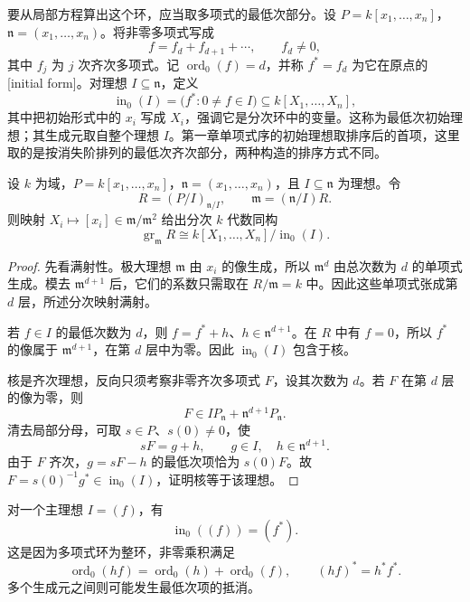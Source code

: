 \ProseParagraphBreak

要从局部方程算出这个环，应当取多项式的最低次部分。设 \(P=k[x_1,\ldots,x_n]\)，\(\mathfrak n=(x_1,\ldots,x_n)\)。将非零多项式写成
\[
	f=f_d+f_{d+1}+\cdots,\qquad f_d\ne0,
\]
其中 \(f_j\) 为 \(j\) 次齐次多项式。记 \(\operatorname{ord}_0(f)=d\)，并称 \(f^\ast=f_d\) 为它在原点的[initial form]。对理想 \(I\subseteq\mathfrak n\)，定义
\[
	\operatorname{in}_0(I)
	=\bigl(f^\ast:0\ne f\in I\bigr)\subseteq k[X_1,\ldots,X_n],
\]
其中把初始形式中的 \(x_i\) 写成 \(X_i\)，强调它是分次环中的变量。这称为最低次初始理想；其生成元取自整个理想 \(I\)。第一章单项式序的初始理想取排序后的首项，这里取的是按消失阶排列的最低次齐次部分，两种构造的排序方式不同。

\begin{proposition}
\label{g5:prop:initial-ideal-tangent-cone}
	设 \(k\) 为域，\(P=k[x_1,\ldots,x_n]\)，\(\mathfrak n=(x_1,\ldots,x_n)\)，且 \(I\subseteq\mathfrak n\) 为理想。令
	\[
		R=(P/I)_{\mathfrak n/I},\qquad
		\mathfrak m=(\mathfrak n/I)R.
	\]
	则映射 \(X_i\mapsto[x_i]\in\mathfrak m/\mathfrak m^2\) 给出分次 \(k\) 代数同构
	\[
		\operatorname{gr}_{\mathfrak m}R
		\cong k[X_1,\ldots,X_n]/\operatorname{in}_0(I).
	\]
\end{proposition}
\begin{proof}
	先看满射性。极大理想 \(\mathfrak m\) 由 \(x_i\) 的像生成，所以 \(\mathfrak m^d\) 由总次数为 \(d\) 的单项式生成。模去 \(\mathfrak m^{d+1}\) 后，它们的系数只需取在 \(R/\mathfrak m=k\) 中。因此这些单项式张成第 \(d\) 层，所述分次映射满射。

	若 \(f\in I\) 的最低次数为 \(d\)，则 \(f=f^\ast+h\)、\(h\in\mathfrak n^{d+1}\)。在 \(R\) 中有 \(f=0\)，所以 \(f^\ast\) 的像属于 \(\mathfrak m^{d+1}\)，在第 \(d\) 层中为零。因此 \(\operatorname{in}_0(I)\) 包含于核。

	核是齐次理想，反向只须考察非零齐次多项式 \(F\)，设其次数为 \(d\)。若 \(F\) 在第 \(d\) 层的像为零，则
	\[
		F\in IP_{\mathfrak n}+\mathfrak n^{d+1}P_{\mathfrak n}.
	\]
	清去局部分母，可取 \(s\in P\)、\(s(0)\ne0\)，使
	\[
		sF=g+h,\qquad g\in I,\quad h\in\mathfrak n^{d+1}.
	\]
	由于 \(F\) 齐次，\(g=sF-h\) 的最低次项恰为 \(s(0)F\)。故 \(F=s(0)^{-1}g^\ast\in\operatorname{in}_0(I)\)，证明核等于该理想。
\end{proof}

对一个主理想 \(I=(f)\)，有
\[
	\operatorname{in}_0((f))=(f^\ast).
\]
这是因为多项式环为整环，非零乘积满足
\[
	\operatorname{ord}_0(hf)=\operatorname{ord}_0(h)+\operatorname{ord}_0(f),
	\qquad (hf)^\ast=h^\ast f^\ast.
\]
多个生成元之间则可能发生最低次项的抵消。


